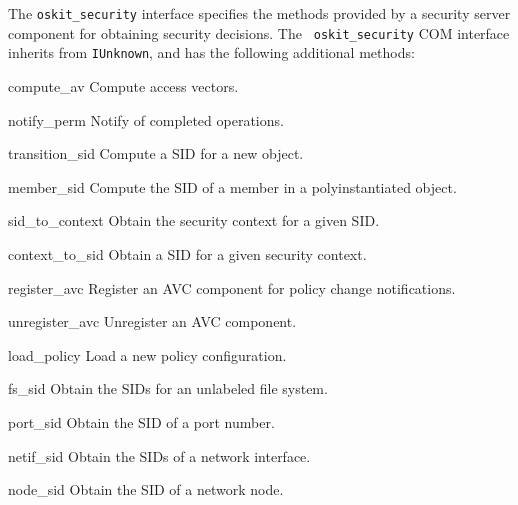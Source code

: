 	The {\tt oskit_security} interface specifies the methods
provided by a security server component for obtaining security
decisions.  The {\tt
oskit_security} COM interface inherits from {\tt IUnknown}, and has
the following additional methods:
\begin{csymlist}
\item[compute\_av]
	Compute access vectors.
\item[notify\_perm]
 	Notify of completed operations.
\item[transition\_sid]
	Compute a SID for a new object.
\item[member\_sid]
	Compute the SID of a member in a polyinstantiated object.
\item[sid\_to\_context]
	Obtain the security context for a given SID.
\item[context\_to\_sid]
	Obtain a SID for a given security context.
\item[register\_avc]
	Register an AVC component for policy change notifications.
\item[unregister\_avc]
	Unregister an AVC component.
\item[load\_policy]
	Load a new policy configuration.
\item[fs\_sid]
	Obtain the SIDs for an unlabeled file system.
\item[port\_sid]
	Obtain the SID of a port number.
\item[netif\_sid]
	Obtain the SIDs of a network interface.
\item[node\_sid]
	Obtain the SID of a network node.
\end{csymlist}


